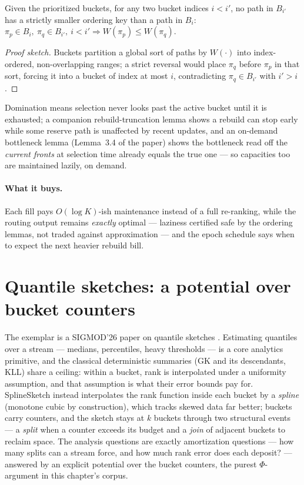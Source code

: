 \begin{lemma}\label{lem:amo-order-nodom}
Given the prioritized buckets, for any two bucket indices $i < i'$, no path
in $B_{i'}$ has a strictly smaller ordering key than a path in $B_i$:
$\pi_p \in B_i,\ \pi_q \in B_{i'},\ i < i' \Rightarrow W(\pi_p) \le
W(\pi_q)$. \eop
\end{lemma}

\begin{proof}[Proof sketch]
Buckets partition a global sort of paths by $W(\cdot)$ into index-ordered,
non-overlapping ranges; a strict reversal would place $\pi_q$ before $\pi_p$
in that sort, forcing it into a bucket of index at most $i$, contradicting
$\pi_q \in B_{i'}$ with $i' > i$.
\end{proof}

Domination means selection never looks past the active bucket until it is
exhausted; a companion rebuild-truncation lemma shows a rebuild can stop
early while some reserve path is unaffected by recent updates, and an
on-demand bottleneck lemma (Lemma~3.4 of the paper) shows the bottleneck
read off the \emph{current fronts} at selection time already equals the
true one --- so capacities too are maintained lazily, on demand.

\paragraph{What it buys.}
Each fill pays $O(\log K)$-ish maintenance instead of a full re-ranking,
while the routing output remains \emph{exactly} optimal --- laziness
certified safe by the ordering lemmas, not traded against approximation ---
and the epoch schedule says when to expect the next heavier rebuild bill.

\section{Quantile sketches: a potential over bucket counters}
\label{sec:amo-spline}

The exemplar is a SIGMOD'26 paper on quantile sketches \citep{sigmod26-363}.
Estimating quantiles over a stream --- medians, percentiles, heavy
thresholds --- is a core analytics primitive, and the classical
deterministic summaries (GK and its descendants, KLL) share a ceiling:
within a bucket, rank is interpolated under a uniformity assumption, and
that assumption is what their error bounds pay for. SplineSketch instead
interpolates the rank function inside each bucket by a \emph{spline}
(monotone cubic by construction), which tracks skewed data far better;
buckets carry counters, and the sketch stays at $k$ buckets through two
structural events --- a \emph{split} when a counter exceeds its budget and
a \emph{join} of adjacent buckets to reclaim space. The analysis questions
are exactly amortization questions --- how many splits can a stream force,
and how much rank error does each deposit? --- answered by an explicit
potential over the bucket counters, the purest $\Phi$-argument in this
chapter's corpus.

